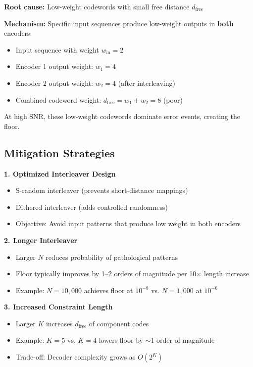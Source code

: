 \textbf{Root cause:} Low-weight codewords with small free distance $d_{\text{free}}$

\textbf{Mechanism:} Specific input sequences produce low-weight outputs in \textbf{both} encoders:
\begin{itemize}
\item Input sequence with weight $w_{\text{in}} = 2$
\item Encoder 1 output weight: $w_1 = 4$
\item Encoder 2 output weight: $w_2 = 4$ (after interleaving)
\item Combined codeword weight: $d_{\text{free}} = w_1 + w_2 = 8$ (poor)
\end{itemize}

At high SNR, these low-weight codewords dominate error events, creating the floor.

\subsection{Mitigation Strategies}

\textbf{1. Optimized Interleaver Design}
\begin{itemize}
\item S-random interleaver (prevents short-distance mappings)
\item Dithered interleaver (adds controlled randomness)
\item Objective: Avoid input patterns that produce low weight in both encoders
\end{itemize}

\textbf{2. Longer Interleaver}
\begin{itemize}
\item Larger $N$ reduces probability of pathological patterns
\item Floor typically improves by 1--2 orders of magnitude per 10$\times$ length increase
\item Example: $N = 10{,}000$ achieves floor at $10^{-8}$ vs. $N = 1{,}000$ at $10^{-6}$
\end{itemize}

\textbf{3. Increased Constraint Length}
\begin{itemize}
\item Larger $K$ increases $d_{\text{free}}$ of component codes
\item Example: $K = 5$ vs. $K = 4$ lowers floor by $\sim$1 order of magnitude
\item Trade-off: Decoder complexity grows as $O(2^K)$
\end{itemize}

